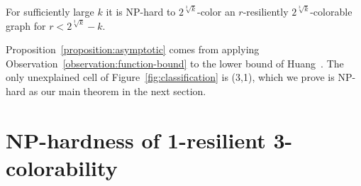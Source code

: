 \begin{proposition}\label{proposition:asymptotic}
For sufficiently large $k$ it is NP-hard to $2^{\sqrt[3]{k}}$-color an
$r$-resiliently $2^{\sqrt[3]{k}}$-colorable graph for $r < 2^{\sqrt[3]{k}} - k$.
\end{proposition}

Proposition~\ref{proposition:asymptotic} comes from applying
Observation~\ref{observation:function-bound} to the lower bound of
Huang~\cite{Huang13}.  The only unexplained cell of
Figure~\ref{fig:classification} is (3,1), which we prove is NP-hard as our main
theorem in the next section.

\section{NP-hardness of 1-resilient 3-colorability}\label{sec:main-theorem}

